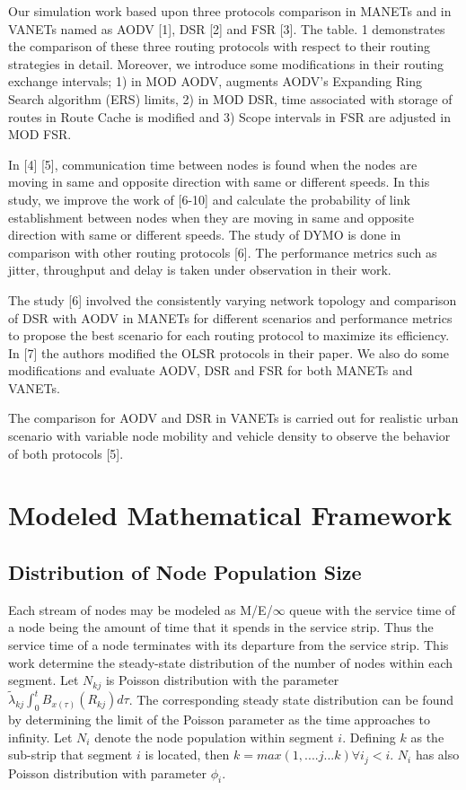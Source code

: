 \documentclass[journal]{IEEEtran}
\begin{document}
Our simulation work based upon three protocols comparison in MANETs and in VANETs named as AODV [1], DSR [2] and FSR [3]. The table. 1 demonstrates the comparison of these three routing protocols with respect to their routing strategies in detail. Moreover, we introduce some modifications in their routing exchange intervals; 1) in MOD AODV, augments AODV's Expanding Ring Search algorithm (ERS) limits, 2) in MOD DSR, time associated with storage of routes in Route Cache is modified and 3) Scope intervals in FSR are adjusted in MOD FSR.

In [4] [5], communication time between nodes is found when the nodes are moving in same and opposite direction with same or different speeds. In this study, we improve the work of [6-10] and calculate the probability of link establishment between nodes when they are moving in same and opposite direction with same or different speeds. The study of DYMO is done in comparison with other routing protocols [6]. The performance metrics such as jitter, throughput and delay is taken under observation in their work.

The study [6] involved the consistently varying network topology and comparison of DSR with AODV in MANETs for different scenarios and performance metrics to propose the best scenario for each routing protocol to maximize its efficiency. In [7] the authors modified the OLSR protocols in their paper. We also do some modifications and evaluate AODV, DSR and FSR for both MANETs and VANETs.

The comparison for AODV and DSR in VANETs is carried out for realistic urban scenario with variable node mobility and vehicle density to observe the behavior of both protocols [5].




\section{Modeled Mathematical Framework}
\subsection{Distribution of Node Population Size}

Each stream of nodes may be modeled as M/E/$\infty$ queue with the service time of a node being the amount of time that it spends in the service strip. Thus the service time of a node terminates with its departure from the service strip.
This work determine the steady-state distribution of the number of nodes within each segment. Let $N_{kj}$ is Poisson distribution with the parameter $\tilde{\lambda}_{kj}\int_{0}^{t}B_{x(\tau)}(R_{kj})d\tau$. The corresponding steady state distribution can be found by determining the limit of the Poisson parameter as the time approaches to infinity.
Let ${N_{i}}$ denote the node population within segment $i$. Defining $k$ as the sub-strip that segment $i$ is located, then $k={max(1,....j...k)}{\forall}{i_{j}<i}$.
$N_{i}$ has also Poisson distribution with parameter $\phi_{i}$.
\end{document}
